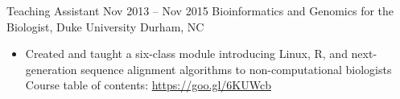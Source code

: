 

\begin{resentries}

  \resentrybeta
    {Teaching Assistant} %
    {Nov 2013 -- Nov 2015} %
    {Bioinformatics and Genomics for the Biologist, Duke University} %
    {Durham, NC} %
    {
      \begin{itemize}[leftmargin=*, itemsep=-1.5mm]
        \item{Created and taught a six-class module introducing Linux, R, and next-generation sequence alignment algorithms to non-computational biologists \xspace \bullet \xspace \xspace Course table of contents: \href{https://goo.gl/6KUWCb}{\color{blue} https://goo.gl/6KUWcb}}
      \end{itemize}
    }

\end{resentries}
